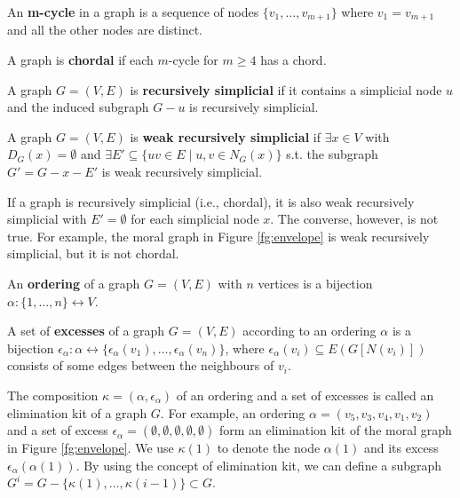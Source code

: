 \begin{definition}
An \textbf{m-cycle} in a graph is a sequence of nodes $\{v_1, \dots, v_{m+1}\}$ where $v_1 = v_{m+1}$ and all the other nodes are distinct.  
\end{definition}

\begin{definition}
A graph is \textbf{chordal} if each $m$-cycle for $m \ge 4$ has a chord.
\end{definition}

\begin{definition}
A graph $G=(V,E)$ is \textbf{recursively simplicial} if it contains a simplicial node $u$ and the induced subgraph $G-u$ is recursively simplicial. 
\end{definition}

\begin{definition}
\label{def:wrs}
A graph $G=(V,E)$ is \textbf{weak recursively simplicial} if $\exists x \in V$ with $D_G(x)=\emptyset$ and $\exists E'\subseteq \{uv \in E \mid u,v \in N_G(x)\}$ s.t. the subgraph $G'=G-x-E'$ is weak recursively simplicial. 
\end{definition}
If a graph is recursively simplicial (i.e., chordal), it is also weak recursively simplicial with $E'=\emptyset$ for each simplicial node $x$. The converse, however, is not true. For example, the moral graph in Figure \ref{fg:envelope} is weak recursively simplicial, but it is not chordal. 

\begin{definition}
An \textbf{ordering} of a graph $G=(V,E)$ with $n$ vertices is a bijection $\alpha: \{1, \dots, n\} \leftrightarrow V$. 
\end{definition}

\begin{definition}
A set of \textbf{excesses} of a graph $G=(V,E)$ according to an ordering $\alpha$ is a bijection $\epsilon_{\alpha}: \alpha \leftrightarrow \{\epsilon_{\alpha}(v_1), \dots, \epsilon_{\alpha}(v_n)\}$, where $\epsilon_{\alpha}(v_i) \subseteq E(G[N(v_i)])$ consists of some edges between the neighbours of $v_i$.
\end{definition}
The composition $\kappa=(\alpha,\epsilon_{\alpha})$ of an ordering and a set of excesses is called an elimination kit of a graph $G$. For example, an ordering $\alpha=(v_5,v_3,v_4,v_1,v_2)$ and a set of excess $\epsilon_{\alpha}=(\emptyset,\emptyset,\emptyset,\emptyset,\emptyset)$ form an elimination kit of the moral graph in Figure \ref{fg:envelope}. We use $\kappa(1)$ to denote the node $\alpha(1)$ and its excess $\epsilon_{\alpha}(\alpha(1))$. By using the concept of elimination kit, we can define a subgraph $G^i=G-\{\kappa(1),\dots,\kappa(i-1)\} \subset G$. 

